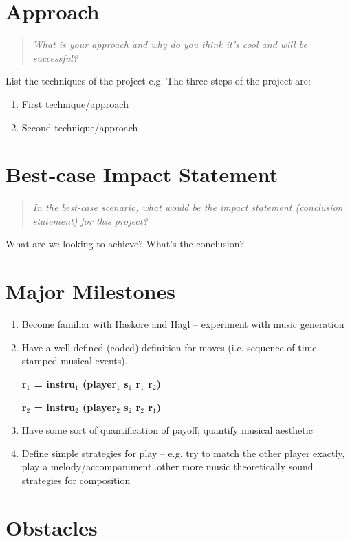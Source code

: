 \documentclass{proc}
\begin{document}
\section{Approach}
\begin{quote}
\textit {What is your approach and why do you think it's cool and will be successful?}
\end{quote}

List the techniques of the project e.g.
The three steps of the project are:
\begin{enumerate}
\item First technique/approach
\item Second technique/approach
\end{enumerate}

\section{Best-case Impact Statement}
\begin{quote}
\textit {In the best-case scenario, what would be the impact statement (conclusion statement) for this project?}
\end{quote}

What are we looking to achieve?  What's the conclusion?

\section{Major Milestones}

\begin{enumerate}
\item Become familiar with Haskore and Hagl -- experiment with music generation 
\item Have a well-defined (coded) definition for moves (i.e. sequence of time-stamped musical events).  

\textbf{r$_{1}$ = instru$_{1}$ (player$_{1}$ s$_{1}$ r$_{1}$ r$_{2}$)} 

\textbf{r$_{2}$ = instru$_{2}$ (player$_{2}$ s$_{2}$ r$_{2}$ r$_{1}$)} 
\item Have some sort of quantification of payoff; quantify musical aesthetic 
\item Define simple strategies for play  -- e.g. try to match the other player exactly, play a melody/accompaniment..other more music theoretically sound strategies for composition
\end{enumerate}


\section{Obstacles}
\end{document}
